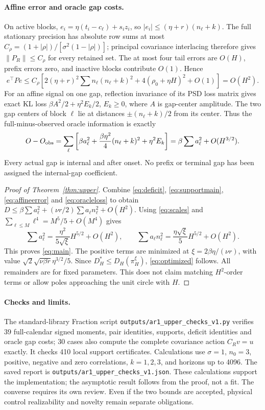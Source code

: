 \documentclass[11pt]{article}
\begin{document}
\paragraph{Affine error and oracle gap costs.}
On active blocks,
$e_i=\eta(t_i-c_\ell)+s_i z_i$, so
$|e_i|\le(\eta+r)(n_\ell+k)$.
The full stationary precision has absolute row sums at most
$C_\rho=(1+|\rho|)/[\sigma^2(1-|\rho|)]$; principal covariance interlacing
therefore gives $\|P_R\|\le C_\rho$ for every retained set.
The at most four tail errors are $O(H)$, prefix errors zero, and inactive
blocks contribute $O(1)$. Hence
\begin{equation}\label{eq:affineerror}
 e^\top Pe\le C_\rho\left[2(\eta+r)^2\sum n_\ell(n_\ell+k)^2
 +4(\rho_0+\eta H)^2+O(1)\right]=O(H^2).
\end{equation}
For an affine signal on one gap, reflection invariance of its PSD loss
matrix gives exact KL loss
$\beta A^2/2+\eta^2E_k/2$, $E_k\ge0$, where $A$ is gap-center amplitude.
The two gap centers of block $\ell$ lie at distances
$\pm(n_\ell+k)/2$ from its center. Thus the full-minus-observed oracle
information is exactly
\begin{equation}\label{eq:oracleloss}
 O-O_{\rm obs}=\sum_\ell\left[\beta a_\ell^2
 +\frac{\beta\eta^2}{4}(n_\ell+k)^2+\eta^2E_k\right]
 =\beta\sum a_\ell^2+O(H^{3/2}).
\end{equation}
Every actual gap is internal and after onset. No prefix or terminal gap
has been assigned the internal-gap coefficient.

\begin{proof}[Proof of Theorem~\ref{thm:upper}]
Combine \eqref{eq:deficit}, \eqref{eq:supportmain},
\eqref{eq:affineerror} and \eqref{eq:oracleloss} to obtain
$D\le\beta\sum a_\ell^2+(\nu r/2)\sum a_\ell n_\ell^2+O(H^2)$.
Using \eqref{eq:scales} and $\sum_{\ell\le M}\ell^4=M^5/5+O(M^4)$ gives
\[
 \sum a_\ell^2=\frac{\eta^2}{5\sqrt\xi}H^{5/2}+O(H^2),\qquad
 \sum a_\ell n_\ell^2=\frac{\eta\sqrt\xi}{5}H^{5/2}+O(H^2).
\]
This proves \eqref{eq:main}. The positive terms are minimized at
$\xi=2\beta\eta/(\nu r)$, with value
$\sqrt2\sqrt{\nu\beta r}\eta^{3/2}/5$.
Since $D_H^*\le D_H(\pi_H^\xi)$, \eqref{eq:optimized} follows.
All remainders are for fixed parameters. This does not claim matching
$H^2$-order terms or allow poles approaching the unit circle with $H$.
\end{proof}

\paragraph{Checks and limits.}
The standard-library Fraction script
\texttt{outputs/ar1\_upper\_checks\_v1.py} verifies 39 full-calendar signed
moments, pair identities, supports, deficit identities and oracle gap costs;
30 cases also compute the complete covariance action $C_Rv=u$ exactly.
It checks 410 local support certificates. Calculations use $\sigma=1$,
$n_0=3$, positive, negative and zero correlations, $k=1,2,3$, and horizons
up to 4096. The saved report is
\texttt{outputs/ar1\_upper\_checks\_v1.json}. These calculations support the
implementation; the asymptotic result follows from the proof, not a fit.
The converse requires its own review. Even if the two bounds are accepted,
physical control realizability and novelty remain separate obligations.
\end{document}
